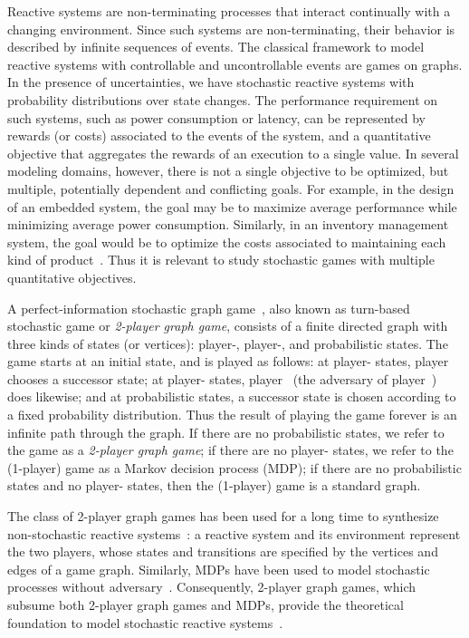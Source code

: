 \documentclass{article}
\newcommand{\half}{}
\begin{document}
Reactive systems are non-terminating processes that interact continually with a changing environment. 
Since such systems are non-terminating, their behavior is described by infinite sequences of events.
The classical framework to model reactive systems with controllable and uncontrollable events are games on graphs. 
In the presence of uncertainties, we have stochastic reactive systems with probability distributions over state changes. 
The performance requirement on such systems, such as power consumption or latency,
can be represented by rewards (or costs) associated to the events of the system,
and a quantitative objective that aggregates the rewards of an execution to a single value.
In several modeling domains, however, there is not a single objective 
to be optimized, but multiple, potentially dependent and conflicting goals.
For example, in the design of an embedded system, the goal may be to maximize 
average performance while minimizing average power consumption.
Similarly, in an inventory management system, the goal would be to optimize
the costs associated to maintaining each kind of product~\cite{FV97,AltmanBook}. 
Thus it is relevant to study stochastic games with multiple 
quantitative objectives.

\smallskip{}
A perfect-information stochastic graph game~\cite{Condon92}, also known as turn-based stochastic 
game or \emph{2\half-player graph game}, consists of a finite directed graph with three kinds of states (or vertices): 
player-, player-, and probabilistic states.
The game starts at an initial state, and is played as follows: 
at player- states, player~ chooses a successor state;
at player- states, player~ (the adversary of player~)  does likewise;
and at probabilistic states, a successor state 
is chosen according to a fixed probability distribution.
Thus the result of playing the game forever is an infinite path through 
the graph.
If there are no probabilistic states, we refer to the game as a 
\emph{2-player graph game}; 
if there are no player- states, we refer to the (1\half-player) game
as a Markov decision process (MDP);
if there are no probabilistic states and no player- states,
then the (1-player) game is a standard graph.

The class of 2-player graph games has been used for a long time 
to synthesize non-stochastic reactive systems~\cite{BL69,PnueliRosner,RamadgeWonham}:
a reactive system and its environment represent the two players, whose states 
and transitions are specified by the vertices and edges of a game graph.
Similarly, MDPs have been used to model stochastic processes without 
adversary~\cite{FV97,Puterman}.
Consequently, 2\half-player graph games, which subsume both 2-player 
graph games and MDPs, provide the theoretical foundation
to model stochastic reactive systems~\cite{FV97,RF91}. 
\end{document}

